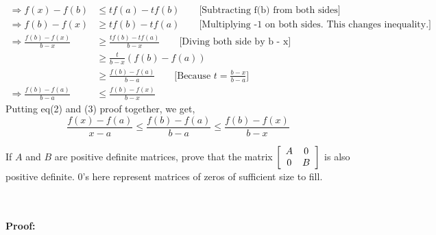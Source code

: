 \documentclass[a4paper,10pt]{article}
\begin{document}
\begin{enumerate}
\begin{equation}
\begin{split}
       \Rightarrow f(x) - f(b) & \leq tf(a) - tf(b) \hspace{2em} \text{[Subtracting f(b) from both sides]} \\
        \Rightarrow f(b) - f(x) & \geq tf(b) - tf(a) \hspace{2em} \text{[Multiplying -1 on both sides. This changes inequality.]} \\
       \Rightarrow \frac{f(b) - f(x)}{b-x} & \geq \frac{tf(b) - tf(a)}{b-x} \hspace{2em} \text{[Diving both side by b - x]} \\
       & \geq \frac{t}{b-x}(f(b) - f(a)) \\
       & \geq \frac{f(b) - f(a)}{b-a} \hspace{2em} \text{[Because $t = \frac{b-x}{b-a}$]} \\
       \Rightarrow \frac{f(b) - f(a)}{b-a} & \leq \frac{f(b) - f(x)}{b-x} 
       \end{split} 
   \end{equation}
   Putting eq(2) and (3) proof together, we get,
   \begin{equation}
       \frac{f(x) - f(a)}{x-a} \leq \frac{f(b) - f(a)}{b-a} \leq \frac{f(b) - f(x)}{b-x} 
   \end{equation}
   
    \newpage
    \begin{taskbox}
    If $A$ and $B$ are positive definite matrices, prove that the matrix $\left[\begin{array}{c c} A  &0 \\ 0 &B \end{array} \right]$ is also positive definite. $0$'s here represent matrices of zeros of sufficient size to fill. 
    \end{taskbox}

    \\ \\ \textbf{Proof:}


\end{enumerate}
\end{document}
